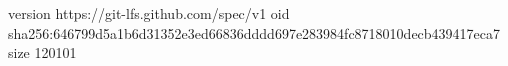 version https://git-lfs.github.com/spec/v1
oid sha256:646799d5a1b6d31352e3ed66836dddd697e283984fc8718010decb439417eca7
size 120101
